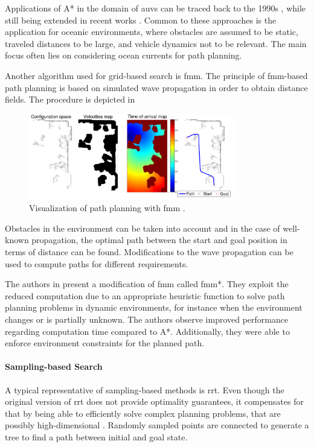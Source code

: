 Applications of A* in the domain of \acp{auv} can be traced back to the 1990s \cite{Carroll92}, while still being extended in recent works \cite{zhang20}. Common to these approaches is the application for oceanic environments, where obstacles are assumed to be static, traveled distances to be large, and vehicle dynamics not to be relevant. The main focus often lies on considering ocean currents for path planning.

Another algorithm used for grid-based search is \ac{fmm}. The principle of \acs{fmm}-based path planning is based on simulated wave propagation in order to obtain distance fields. The procedure is depicted in 
\begin{figure}
    \centering
    \includegraphics[width=0.8\textwidth]{images/02/fmm.png}
    \caption{Visualization of path planning with \ac{fmm} \cite{Gomez15}.}
    \label{fig:fmm}
\end{figure}
Obstacles in the environment can be taken into account and in the case of well-known propagation, the optimal path between the start and goal position in terms of distance can be found. Modifications to the wave propagation can be used to compute paths for different requirements.

The authors in \cite{Petres09} present a modification of \ac{fmm} called \acs{fmm}*. They exploit the reduced computation due to an appropriate heuristic function to solve path planning problems in dynamic environments, for instance when the environment changes or is partially unknown. The authors observe improved performance regarding computation time compared to A*. Additionally, they were able to enforce environment constraints for the planned path.

\paragraph{Sampling-based Search}

A typical representative of sampling-based methods is \ac{rrt}. Even though the original version of \ac{rrt} does not provide optimality guarantees, it compensates for that by being able to efficiently solve complex planning problems, that are possibly high-dimensional \cite{Devaurs16}. Randomly sampled points are connected to generate a tree to find a path between initial and goal state.

